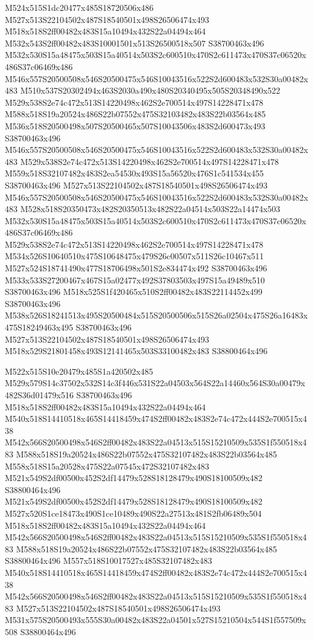 \documentclass{article}
\begin{document}
\begin{multicols}{2}
M524x515S1dc20477x485S18720506x486 M527x513S22104502x487S18540501x498S26506474x493 M518x518S2ff00482x483S15a10494x432S22a04494x464 M532x543S2ff00482x483S10001501x513S26500518x507 S38700463x496 M532x530S15a48475x503S15a40514x503S2c600510x470S2c611473x470S37c06520x486S37c06469x486 M546x557S20500508x546S20500475x546S10043516x522S2d600483x532S30a00482x483 M510x537S20302494x463S2030a490x480S20340495x505S20348490x522 M529x538S2e74c472x513S14220498x462S2e700514x497S14228471x478 M588x518S19a20524x486S22b07552x475S32103482x483S22b03564x485 M536x518S20500498x507S20500465x507S10043506x483S2d600473x493 S38700463x496 M546x557S20500508x546S20500475x546S10043516x522S2d600483x532S30a00482x483 M529x538S2e74c472x513S14220498x462S2e700514x497S14228471x478 M559x518S32107482x483S2ea54530x493S15a56520x476S1c541534x455 S38700463x496 M527x513S22104502x487S18540501x498S26506474x493 M546x557S20500508x546S20500475x546S10043516x522S2d600483x532S30a00482x483 M528x518S20350473x482S20350513x482S22a04514x503S22a14474x503 M532x530S15a48475x503S15a40514x503S2c600510x470S2c611473x470S37c06520x486S37c06469x486 M529x538S2e74c472x513S14220498x462S2e700514x497S14228471x478 M534x526S10640510x475S10648475x479S26c00507x511S26c10467x511 M527x524S18741490x477S18706498x501S2e834474x492 S38700463x496 M533x533S27200467x467S15a02477x492S37803503x497S15a49489x510 S38700463x496 M518x525S1f420465x510S2ff00482x483S22114452x499 S38700463x496 M538x526S18241513x495S20500484x515S20500506x515S26a02504x475S26a16483x475S18249463x495 S38700463x496 M527x513S22104502x487S18540501x498S26506474x493 M518x529S21801458x493S12141465x503S33100482x483 S38800464x496

M522x515S10e20479x485S1a420502x485 M529x579S14c37502x532S14c3f446x531S22a04503x564S22a14460x564S30a00479x482S36d01479x516 S38700463x496 M518x518S2ff00482x483S15a10494x432S22a04494x464 M540x518S14410518x465S14418459x474S2ff00482x483S2e74c472x444S2e700515x438 M542x566S20500498x546S2ff00482x483S22a04513x515S15210509x535S1f550518x483 M588x518S19a20524x486S22b07552x475S32107482x483S22b03564x485 M558x518S15a20528x475S22a07545x472S32107482x483 M521x549S2df00500x452S2df14479x528S18128479x490S18100509x482 S38800464x496 M521x549S2df00500x452S2df14479x528S18128479x490S18100509x482 M527x520S1ce18473x490S1ce10489x490S22a27513x481S2fb06489x504 M518x518S2ff00482x483S15a10494x432S22a04494x464 M542x566S20500498x546S2ff00482x483S22a04513x515S15210509x535S1f550518x483 M588x518S19a20524x486S22b07552x475S32107482x483S22b03564x485 S38800464x496 M557x518S10017527x485S32107482x483 M540x518S14410518x465S14418459x474S2ff00482x483S2e74c472x444S2e700515x438 M542x566S20500498x546S2ff00482x483S22a04513x515S15210509x535S1f550518x483 M527x513S22104502x487S18540501x498S26506474x493 M531x575S20500493x555S30a00482x483S22a04501x527S15210504x544S1f557509x508 S38800464x496


\end{multicols}
\end{document}
